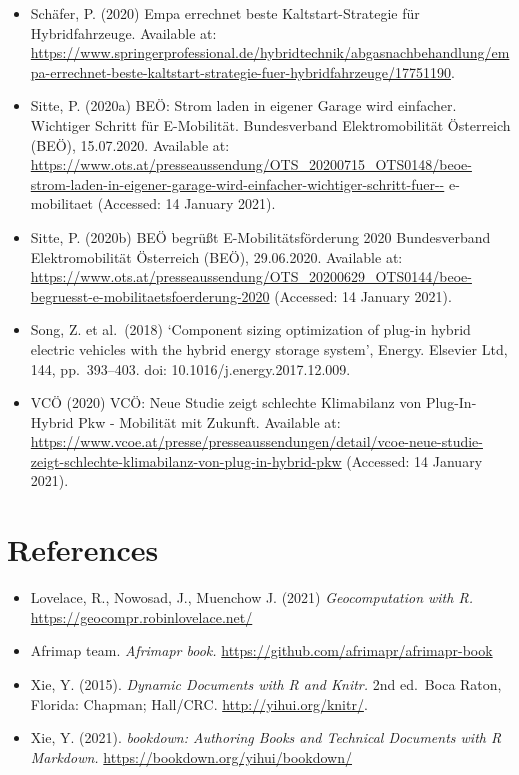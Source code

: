\documentclass[
]{book}
\providecommand{\tightlist}{%
  \setlength{\itemsep}{0pt}\setlength{\parskip}{0pt}}
\begin{document}
\begin{itemize}
\item
  Schäfer, P. (2020) Empa errechnet beste Kaltstart-Strategie für Hybridfahrzeuge. Available at: \url{https://www.springerprofessional.de/hybridtechnik/abgasnachbehandlung/empa-errechnet-beste-kaltstart-strategie-fuer-hybridfahrzeuge/17751190}.
\item
  Sitte, P. (2020a) BEÖ: Strom laden in eigener Garage wird einfacher. Wichtiger Schritt für E-Mobilität. \textbar{} Bundesverband Elektromobilität Österreich (BEÖ), 15.07.2020. Available at: \url{https://www.ots.at/presseaussendung/OTS_20200715_OTS0148/beoe-strom-laden-in-eigener-garage-wird-einfacher-wichtiger-schritt-fuer--} e-mobilitaet (Accessed: 14 January 2021).
\item
  Sitte, P. (2020b) BEÖ begrüßt E-Mobilitätsförderung 2020 \textbar{} Bundesverband Elektromobilität Österreich (BEÖ), 29.06.2020. Available at: \url{https://www.ots.at/presseaussendung/OTS_20200629_OTS0144/beoe-begruesst-e-mobilitaetsfoerderung-2020} (Accessed: 14 January 2021).
\item
  Song, Z. et al.~(2018) `Component sizing optimization of plug-in hybrid electric vehicles with the hybrid energy storage system', Energy. Elsevier Ltd, 144, pp.~393--403. doi: 10.1016/j.energy.2017.12.009.
\item
  VCÖ (2020) VCÖ: Neue Studie zeigt schlechte Klimabilanz von Plug-In-Hybrid Pkw - Mobilität mit Zukunft. Available at: \url{https://www.vcoe.at/presse/presseaussendungen/detail/vcoe-neue-studie-zeigt-schlechte-klimabilanz-von-plug-in-hybrid-pkw} (Accessed: 14 January 2021).
\end{itemize}

\hypertarget{reference}{%
\chapter{References}\label{reference}}

\begin{itemize}
\tightlist
\item
  Lovelace, R., Nowosad, J., Muenchow J. (2021) \emph{Geocomputation with R.} \url{https://geocompr.robinlovelace.net/}
\item
  Afrimap team. \emph{Afrimapr book.} \url{https://github.com/afrimapr/afrimapr-book}
\item
  Xie, Y. (2015). \emph{Dynamic Documents with R and Knitr.} 2nd ed.~Boca Raton, Florida: Chapman; Hall/CRC. \url{http://yihui.org/knitr/}.
\item
  Xie, Y. (2021). \emph{bookdown: Authoring Books and Technical Documents with R Markdown.} \url{https://bookdown.org/yihui/bookdown/}
\end{itemize}

  
\end{document}
